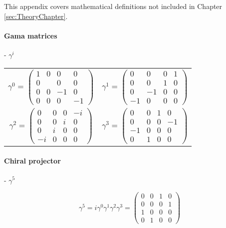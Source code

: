 
\label{appendixA}

This appendix covers mathematical definitions not included in Chapter \ref{sec:TheoryChapter}.

\paragraph{Gama matrices} - $\gamma^{i}$

\begin{table}[h]
    \centering
    \begin{tabular}{c c}
        $\gamma^{0} = \begin{pmatrix} 1 & 0 & 0 & 0 \\ 0 & & 0 & 0 \\ 0 & 0 & -1 & 0 \\ 0 & 0 & 0 & -1 \end{pmatrix}$ & $\gamma^{1} = \begin{pmatrix} 0 & 0 & 0 & 1 \\ 0 & 0 & 1 & 0 \\ 0 & -1 & 0 & 0 \\ -1 & 0 & 0 & 0 \end{pmatrix}$ \\
        $\gamma^{2} = \begin{pmatrix} 0 & 0 & 0 & -i \\ 0 & 0 & i & 0 \\ 0 & i & 0 & 0 \\ -i & 0 & 0 & 0 \end{pmatrix}$ & $\gamma^{3} = \begin{pmatrix} 0 & 0 & 1 & 0 \\ 0 & 0 & 0 & -1 \\ -1 & 0 & 0 & 0 \\ 0 & 1 & 0 & 0 \end{pmatrix}$
    \end{tabular}
\end{table}

\paragraph{Chiral projector} - $\gamma^{5}$

\begin{equation*}
    \gamma^{5} = i \gamma^{0}\gamma^{1}\gamma^{2}\gamma^{3} = \begin{pmatrix} 0 & 0 & 1 & 0 \\ 0 & 0 & 0 & 1 \\ 1 & 0 & 0 & 0 \\ 0 & 1 & 0 & 0 \end{pmatrix}
\end{equation*}

